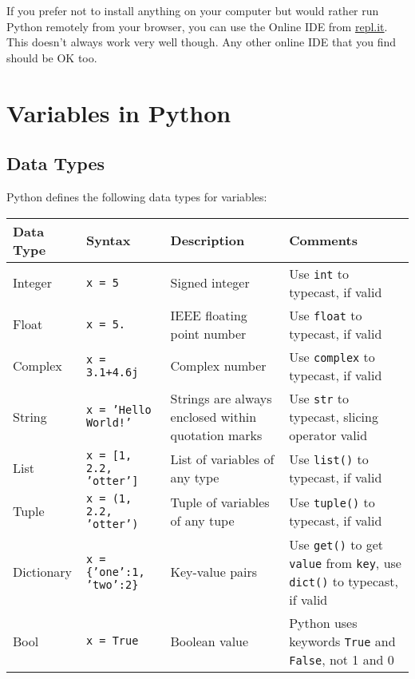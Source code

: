 \documentclass[12pt]{article}
\newcommand{\code}{\texttt}
\begin{document}
If you prefer not to install anything on your computer but would rather run Python remotely from your browser, you can use the Online IDE from \href{https://repl.it/languages/python3}{repl.it}. This doesn't always work very well though. Any other online IDE that you find should be OK too.

\newpage

\section{Variables in Python}
\subsection{Data Types}
Python defines the following data types for variables:

\begin{center}
\begin{tabular}{|p{0.75in}|p{1in}|p{1.5in}|p{1.5in}|}
\hline
\textbf{Data Type} & \textbf{Syntax} & \textbf{Description} & \textbf{Comments} \\ \hline
Integer & \code{x = 5} & Signed integer & Use \code{int} to typecast, if valid \\ \hline
Float & \code{x = 5.} & IEEE floating point number & Use \code{float} to typecast, if valid \\ \hline
Complex & \code{x = 3.1+4.6j} & Complex number & Use \code{complex} to typecast, if valid \\ \hline
String & \code{x = 'Hello World!'} & Strings are always enclosed within quotation marks & Use \code{str} to typecast, slicing operator valid \\ \hline
List & \code{x = [1, 2.2, 'otter']} & List of variables of any type & Use \code{list()} to typecast, if valid \\ \hline
Tuple & \code{x = (1, 2.2, 'otter')} & Tuple of variables of any tupe & Use \code{tuple()} to typecast, if valid \\ \hline
Dictionary & \texttt{x = \{'one':1, 'two':2\}} & Key-value pairs & Use \code{get()} to get \code{value} from \code{key}, use \code{dict()} to typecast, if valid \\ \hline
Bool & \code{x = True} & Boolean value & Python uses keywords \code{True} and \code{False}, not 1 and 0 \\ \hline

\end{tabular}
\end{center}
\end{document}
